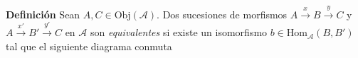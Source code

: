 \documentclass[preview]{standalone}
\begin{document}
\begin{center}
\justifying \textbf{Definición} Sean $A,C\in\text{Obj}(\mathscr{A})$. Dos sucesiones de morfismos $A\xrightarrow{x}B\xrightarrow{y}C$ y $A\xrightarrow{x'}B'\xrightarrow{y'}C$ en $\mathscr{A}$ son \emph{equivalentes} si existe un isomorfismo $b\in\text{Hom}_\mathscr{A}(B,B')$ tal que el siguiente diagrama conmuta
\end{center}
\end{document}
